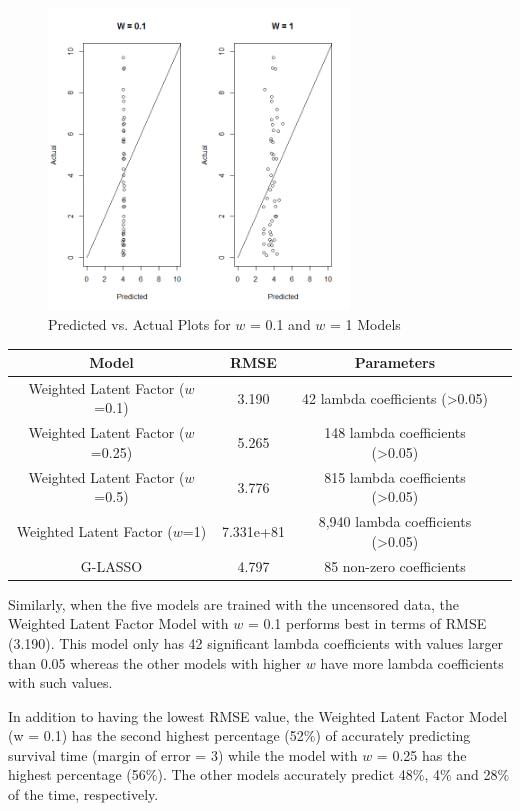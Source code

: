 \documentclass[a4paper]{article}
\begin{document}
\begin{figure}[H]
\centering
\includegraphics[width=80mm]{W_comparison.png}
\caption{Predicted vs. Actual Plots for $w$ = 0.1 and $w$ = 1 Models}
\end{figure}

\begin{center}
\begin{minipage}{\linewidth}
\centering
{} \label{tab:title}
\begin{tabular}{|c|c|c|c|}
\hline	
Model & RMSE & Parameters \\
\hline\hline
Weighted Latent Factor ($w$=0.1) & 3.190
 & 42 lambda coefficients (>0.05) \\
\hline
Weighted Latent Factor ($w$=0.25) & 5.265
 & 148 lambda coefficients (>0.05) \\
\hline
Weighted Latent Factor ($w$=0.5) & 3.776
 & 815 lambda coefficients (>0.05) \\
\hline
Weighted Latent Factor ($w$=1) & 7.331e+81
 & 8,940 lambda coefficients (>0.05) \\
\hline
G-LASSO & 4.797 & 85 non-zero coefficients \\
\hline
\end{tabular}
\end{minipage}
\end{center}

Similarly, when the five models are trained with the uncensored data, the Weighted Latent Factor Model with $w$ = 0.1 performs best in terms of RMSE (3.190). This model only has 42 significant lambda coefficients with values larger than 0.05 whereas the other models with higher $w$ have more lambda coefficients with such values.

In addition to having the lowest RMSE value, the Weighted Latent Factor Model (w = 0.1) has the second highest percentage (52$\%$) of accurately predicting survival time (margin of error = 3) while the model with $w$ = 0.25 has the highest percentage (56$\%$). The other models accurately predict 48$\%$, 4$\%$ and 28$\%$ of the time, respectively.
\end{document}
